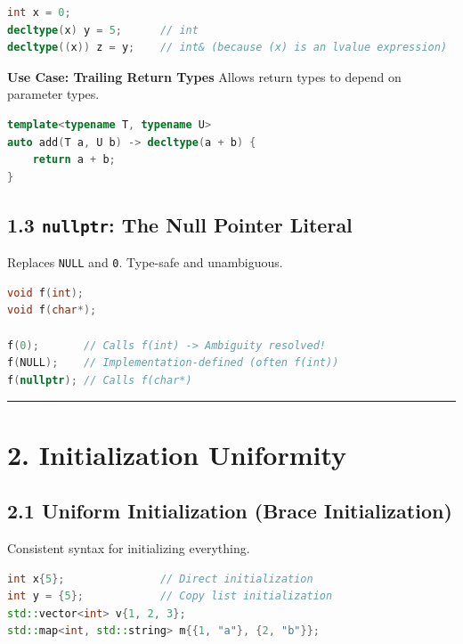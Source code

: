 \begin{lstlisting}[language={C++}]
int x = 0;
decltype(x) y = 5;      // int
decltype((x)) z = y;    // int& (because (x) is an lvalue expression)
\end{lstlisting}

\textbf{Use Case: Trailing Return Types} Allows return types to depend
on parameter types.

\begin{lstlisting}[language={C++}]
template<typename T, typename U>
auto add(T a, U b) -> decltype(a + b) {
    return a + b;
}
\end{lstlisting}

\hypertarget{nullptr-the-null-pointer-literal}{%
\subsection{\texorpdfstring{1.3 \texttt{nullptr}: The Null Pointer
Literal}{1.3 nullptr: The Null Pointer Literal}}\label{nullptr-the-null-pointer-literal}}

Replaces \passthrough{\lstinline!NULL!} and \passthrough{\lstinline!0!}.
Type-safe and unambiguous.

\begin{lstlisting}[language={C++}]
void f(int);
void f(char*);

f(0);       // Calls f(int) -> Ambiguity resolved!
f(NULL);    // Implementation-defined (often f(int))
f(nullptr); // Calls f(char*)
\end{lstlisting}

\begin{center}\rule{0.5\linewidth}{0.5pt}\end{center}

\hypertarget{initialization-uniformity}{%
\section{2. Initialization Uniformity}\label{initialization-uniformity}}

\hypertarget{uniform-initialization-brace-initialization}{%
\subsection{2.1 Uniform Initialization (Brace
Initialization)}\label{uniform-initialization-brace-initialization}}

Consistent syntax for initializing everything.

\begin{lstlisting}[language={C++}]
int x{5};               // Direct initialization
int y = {5};            // Copy list initialization
std::vector<int> v{1, 2, 3};
std::map<int, std::string> m{{1, "a"}, {2, "b"}};
\end{lstlisting}

